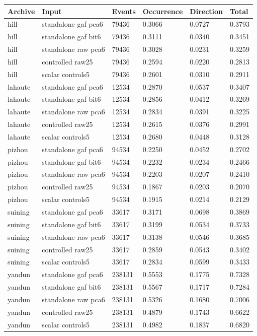 \documentclass[a4paper,11pt]{article}
\newcounter{none}
\begin{document}
{\def\LTcaptype{none} %
\begin{longtable}[]{@{}llllll@{}}
\toprule\noalign{}
Archive & Input & Events & Occurrence & Direction & Total \\
\midrule\noalign{}
\endhead
\bottomrule\noalign{}
\endlastfoot
hill & standalone gaf pca6 & 79436 & 0.3066 & 0.0727 & 0.3793 \\
hill & standalone gaf bit6 & 79436 & 0.3111 & 0.0340 & 0.3451 \\
hill & standalone raw pca6 & 79436 & 0.3028 & 0.0231 & 0.3259 \\
hill & controlled raw25 & 79436 & 0.2594 & 0.0220 & 0.2813 \\
hill & scalar controls5 & 79436 & 0.2601 & 0.0310 & 0.2911 \\
lahaute & standalone gaf pca6 & 12534 & 0.2870 & 0.0537 & 0.3407 \\
lahaute & standalone gaf bit6 & 12534 & 0.2856 & 0.0412 & 0.3269 \\
lahaute & standalone raw pca6 & 12534 & 0.2834 & 0.0391 & 0.3225 \\
lahaute & controlled raw25 & 12534 & 0.2615 & 0.0376 & 0.2991 \\
lahaute & scalar controls5 & 12534 & 0.2680 & 0.0448 & 0.3128 \\
pizhou & standalone gaf pca6 & 94534 & 0.2250 & 0.0452 & 0.2702 \\
pizhou & standalone gaf bit6 & 94534 & 0.2232 & 0.0234 & 0.2466 \\
pizhou & standalone raw pca6 & 94534 & 0.2203 & 0.0207 & 0.2410 \\
pizhou & controlled raw25 & 94534 & 0.1867 & 0.0203 & 0.2070 \\
pizhou & scalar controls5 & 94534 & 0.1915 & 0.0214 & 0.2129 \\
suining & standalone gaf pca6 & 33617 & 0.3171 & 0.0698 & 0.3869 \\
suining & standalone gaf bit6 & 33617 & 0.3199 & 0.0534 & 0.3733 \\
suining & standalone raw pca6 & 33617 & 0.3138 & 0.0546 & 0.3685 \\
suining & controlled raw25 & 33617 & 0.2859 & 0.0543 & 0.3402 \\
suining & scalar controls5 & 33617 & 0.2834 & 0.0599 & 0.3433 \\
yandun & standalone gaf pca6 & 238131 & 0.5553 & 0.1775 & 0.7328 \\
yandun & standalone gaf bit6 & 238131 & 0.5567 & 0.1717 & 0.7284 \\
yandun & standalone raw pca6 & 238131 & 0.5326 & 0.1680 & 0.7006 \\
yandun & controlled raw25 & 238131 & 0.4879 & 0.1743 & 0.6622 \\
yandun & scalar controls5 & 238131 & 0.4982 & 0.1837 & 0.6820 \\
\end{longtable}
}
\end{document}
